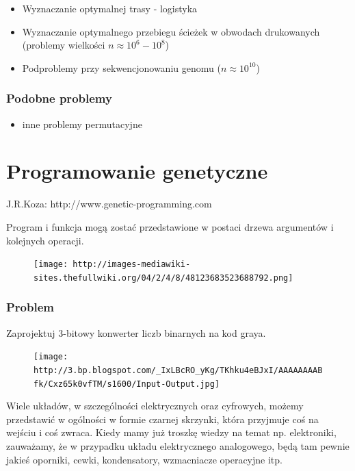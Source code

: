 \documentclass{article}
\begin{document}
\begin{itemize}
\item
  Wyznaczanie optymalnej trasy - logistyka
\item
  Wyznaczanie optymalnego przebiegu ścieżek w obwodach drukowanych
  (problemy wielkości $n \approx 10^6 - 10^8$)
\item
  Podproblemy przy sekwencjonowaniu genomu ($n \approx 10^{10}$)
\end{itemize}

\subsubsection{Podobne problemy}

\begin{itemize}
\item
  inne problemy permutacyjne
\end{itemize}

    \section{Programowanie genetyczne}

J.R.Koza: http://www.genetic-programming.com

Program i funkcja mogą zostać przedstawione w postaci drzewa argumentów
i kolejnych operacji.

\begin{figure}[htbp]
\centering
\texttt{[image: http://images-mediawiki-sites.thefullwiki.org/04/2/4/8/48123683523688792.png]}
\caption{}
\end{figure}

    \subsubsection{Problem}

Zaprojektuj 3-bitowy konwerter liczb binarnych na kod graya.

\begin{figure}[htbp]
\centering
\texttt{[image: http://3.bp.blogspot.com/\_IxLBcRO\_yKg/TKhku4eBJxI/AAAAAAAABfk/Cxz65k0vfTM/s1600/Input-Output.jpg]}
\caption{}
\end{figure}

    Wiele układów, w szczególności elektrycznych oraz cyfrowych, możemy
przedstawić w ogólności w formie czarnej skrzynki, która przyjmuje coś
na wejściu i coś zwraca. Kiedy mamy już troszkę wiedzy na temat np.
elektroniki, zauważamy, że w przypadku układu elektrycznego analogowego,
będą tam pewnie jakieś oporniki, cewki, kondensatory, wzmacniacze
operacyjne itp.
\end{document}
